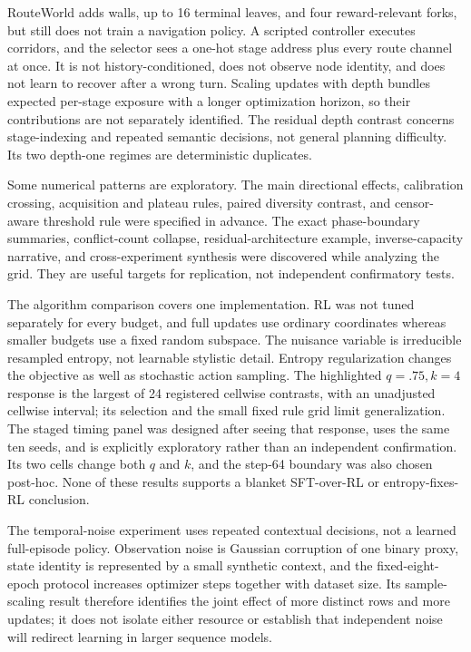 \documentclass[11pt,a4paper]{article}
\begin{document}
RouteWorld adds walls, up to 16 terminal leaves, and four reward-relevant forks, but still does not train a navigation policy. A scripted controller executes corridors, and the selector sees a one-hot stage address plus every route channel at once. It is not history-conditioned, does not observe node identity, and does not learn to recover after a wrong turn. Scaling updates with depth bundles expected per-stage exposure with a longer optimization horizon, so their contributions are not separately identified. The residual depth contrast concerns stage-indexing and repeated semantic decisions, not general planning difficulty. Its two depth-one regimes are deterministic duplicates.

Some numerical patterns are exploratory. The main directional effects, calibration crossing, acquisition and plateau rules, paired diversity contrast, and censor-aware threshold rule were specified in advance. The exact phase-boundary summaries, conflict-count collapse, residual-architecture example, inverse-capacity narrative, and cross-experiment synthesis were discovered while analyzing the grid. They are useful targets for replication, not independent confirmatory tests.

The algorithm comparison covers one implementation. RL was not tuned separately for every budget, and full updates use ordinary coordinates whereas smaller budgets use a fixed random subspace. The nuisance variable is irreducible resampled entropy, not learnable stylistic detail. Entropy regularization changes the objective as well as stochastic action sampling. The highlighted $q=.75,k=4$ response is the largest of 24 registered cellwise contrasts, with an unadjusted cellwise interval; its selection and the small fixed rule grid limit generalization. The staged timing panel was designed after seeing that response, uses the same ten seeds, and is explicitly exploratory rather than an independent confirmation. Its two cells change both $q$ and $k$, and the step-64 boundary was also chosen post-hoc. None of these results supports a blanket SFT-over-RL or entropy-fixes-RL conclusion.

The temporal-noise experiment uses repeated contextual decisions, not a learned full-episode policy. Observation noise is Gaussian corruption of one binary proxy, state identity is represented by a small synthetic context, and the fixed-eight-epoch protocol increases optimizer steps together with dataset size. Its sample-scaling result therefore identifies the joint effect of more distinct rows and more updates; it does not isolate either resource or establish that independent noise will redirect learning in larger sequence models.
\end{document}
